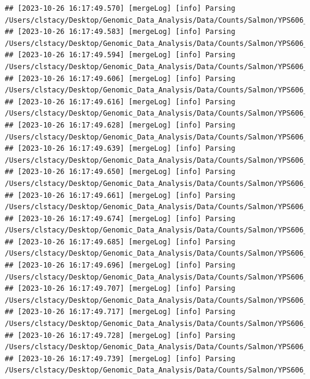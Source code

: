 \documentclass[
]{book}
\begin{document}
\begin{verbatim}
## [2023-10-26 16:17:49.570] [mergeLog] [info] Parsing /Users/clstacy/Desktop/Genomic_Data_Analysis/Data/Counts/Salmon/YPS606_MSN24_ETOH_REP1_R1.fastq.gz_quant/quant.sf
## [2023-10-26 16:17:49.583] [mergeLog] [info] Parsing /Users/clstacy/Desktop/Genomic_Data_Analysis/Data/Counts/Salmon/YPS606_MSN24_ETOH_REP2_R1.fastq.gz_quant/quant.sf
## [2023-10-26 16:17:49.594] [mergeLog] [info] Parsing /Users/clstacy/Desktop/Genomic_Data_Analysis/Data/Counts/Salmon/YPS606_MSN24_ETOH_REP3_R1.fastq.gz_quant/quant.sf
## [2023-10-26 16:17:49.606] [mergeLog] [info] Parsing /Users/clstacy/Desktop/Genomic_Data_Analysis/Data/Counts/Salmon/YPS606_MSN24_ETOH_REP4_R1.fastq.gz_quant/quant.sf
## [2023-10-26 16:17:49.616] [mergeLog] [info] Parsing /Users/clstacy/Desktop/Genomic_Data_Analysis/Data/Counts/Salmon/YPS606_MSN24_MOCK_REP1_R1.fastq.gz_quant/quant.sf
## [2023-10-26 16:17:49.628] [mergeLog] [info] Parsing /Users/clstacy/Desktop/Genomic_Data_Analysis/Data/Counts/Salmon/YPS606_MSN24_MOCK_REP2_R1.fastq.gz_quant/quant.sf
## [2023-10-26 16:17:49.639] [mergeLog] [info] Parsing /Users/clstacy/Desktop/Genomic_Data_Analysis/Data/Counts/Salmon/YPS606_MSN24_MOCK_REP3_R1.fastq.gz_quant/quant.sf
## [2023-10-26 16:17:49.650] [mergeLog] [info] Parsing /Users/clstacy/Desktop/Genomic_Data_Analysis/Data/Counts/Salmon/YPS606_MSN24_MOCK_REP4_R1.fastq.gz_quant/quant.sf
## [2023-10-26 16:17:49.661] [mergeLog] [info] Parsing /Users/clstacy/Desktop/Genomic_Data_Analysis/Data/Counts/Salmon/YPS606_WT_ETOH_REP1_R1.fastq.gz_quant/quant.sf
## [2023-10-26 16:17:49.674] [mergeLog] [info] Parsing /Users/clstacy/Desktop/Genomic_Data_Analysis/Data/Counts/Salmon/YPS606_WT_ETOH_REP2_R1.fastq.gz_quant/quant.sf
## [2023-10-26 16:17:49.685] [mergeLog] [info] Parsing /Users/clstacy/Desktop/Genomic_Data_Analysis/Data/Counts/Salmon/YPS606_WT_ETOH_REP3_R1.fastq.gz_quant/quant.sf
## [2023-10-26 16:17:49.696] [mergeLog] [info] Parsing /Users/clstacy/Desktop/Genomic_Data_Analysis/Data/Counts/Salmon/YPS606_WT_ETOH_REP4_R1.fastq.gz_quant/quant.sf
## [2023-10-26 16:17:49.707] [mergeLog] [info] Parsing /Users/clstacy/Desktop/Genomic_Data_Analysis/Data/Counts/Salmon/YPS606_WT_MOCK_REP1_R1.fastq.gz_quant/quant.sf
## [2023-10-26 16:17:49.717] [mergeLog] [info] Parsing /Users/clstacy/Desktop/Genomic_Data_Analysis/Data/Counts/Salmon/YPS606_WT_MOCK_REP2_R1.fastq.gz_quant/quant.sf
## [2023-10-26 16:17:49.728] [mergeLog] [info] Parsing /Users/clstacy/Desktop/Genomic_Data_Analysis/Data/Counts/Salmon/YPS606_WT_MOCK_REP3_R1.fastq.gz_quant/quant.sf
## [2023-10-26 16:17:49.739] [mergeLog] [info] Parsing /Users/clstacy/Desktop/Genomic_Data_Analysis/Data/Counts/Salmon/YPS606_WT_MOCK_REP4_R1.fastq.gz_quant/quant.sf
\end{verbatim}
\end{document}
